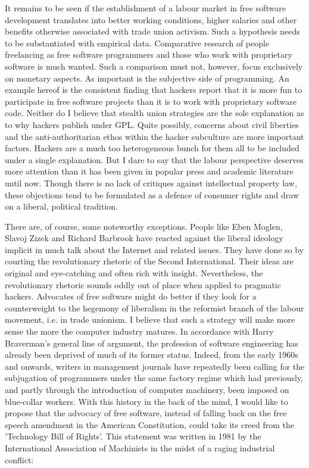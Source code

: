 It remains to be seen if the establishment of a labour market in free software
development translates into better working conditions, higher salaries and other
benef\hbox{}its otherwise associated with trade union activism. Such a hypothesis
needs to be substantiated with empirical data. Comparative research of people
freelancing as free software programmers and those who work with proprietary
software is much wanted. Such a comparison must not, however, focus exclusively
on monetary aspects. As important is the subjective side of programming. An
example hereof is the consistent f\hbox{}inding that hackers report that it is more
fun to participate in free software projects than it is to work with proprietary
software code\cite{gnunited-lakhani_wolf05}. Neither do I believe that stealth
union strategies are the sole explanation as to why hackers publish under GPL.
Quite possibly, concerns about civil liberties and the anti-authoritarian ethos
within the hacker subculture are more important factors. Hackers are a much too
heterogeneous bunch for them all to be included under a single explanation. But
I dare to say that the labour perspective deserves more attention than it has
been given in popular press and academic literature until now. Though there is
no lack of critiques against intellectual property law, these objections tend to
be formulated as a defence of consumer rights and draw on a liberal, political
tradition. 

There are, of course, some noteworthy exceptions. People like Eben Moglen,
Slavoj Zizek and Richard Barbrook have reacted against the liberal ideology
implicit in much talk about the Internet and related issues. They have done so
by courting the revolutionary rhetoric of the Second International. Their ideas
are original and eye-catching and often rich with insight. Nevertheless, the
revolutionary rhetoric sounds oddly out of place when applied to pragmatic
hackers. Advocates of free software might do better if they look for a
counterweight to the hegemony of liberalism in the reformist branch of the
labour movement, i.e. in trade unionism. I believe that such a strategy will
make more sense the more the computer industry matures. In accordance with Harry
Braverman's general line of argument, the profession of software engineering has
already been deprived of much of its former status. Indeed, from the early 1960s
and onwards, writers in management journals have repeatedly been calling for the
subjugation of programmers under the same factory regime which had previously,
and partly through the introduction of computer machinery, been imposed on
blue-collar workers\cite{gnunited-dafermos_soderberg09}. With this history in
the back of the mind, I would like to propose that the advocacy of free
software, instead of falling back on the free speech amendment in the American
Constitution, could take its creed from the 'Technology Bill of Rights'. This
statement was written in 1981 by the International Association of Machinists in
the midst of a raging industrial conf\hbox{}lict:

